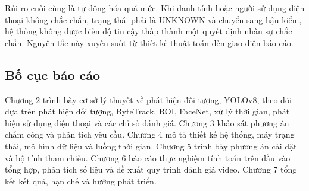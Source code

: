 Rủi ro cuối cùng là tự động hóa quá mức. Khi danh tính hoặc người sử dụng điện thoại không chắc chắn, trạng thái phải là UNKNOWN và chuyển sang hậu kiểm, hệ thống không được biến độ tin cậy thấp thành một quyết định nhân sự chắc chắn. Nguyên tắc này xuyên suốt từ thiết kế thuật toán đến giao diện báo cáo.

\subsection{Bố cục báo cáo}
Chương 2 trình bày cơ sở lý thuyết về phát hiện đối tượng, YOLOv8, theo dõi dựa trên phát hiện đối tượng, ByteTrack, ROI, FaceNet, xử lý thời gian, phát hiện sử dụng điện thoại và các chỉ số đánh giá. Chương 3 khảo sát phương án chấm công và phân tích yêu cầu. Chương 4 mô tả thiết kế hệ thống, máy trạng thái, mô hình dữ liệu và luồng thời gian. Chương 5 trình bày phương án cài đặt và bộ tính tham chiếu. Chương 6 báo cáo thực nghiệm tính toán trên đầu vào tổng hợp, phân tích số liệu và đề xuất quy trình đánh giá video. Chương 7 tổng kết kết quả, hạn chế và hướng phát triển.
